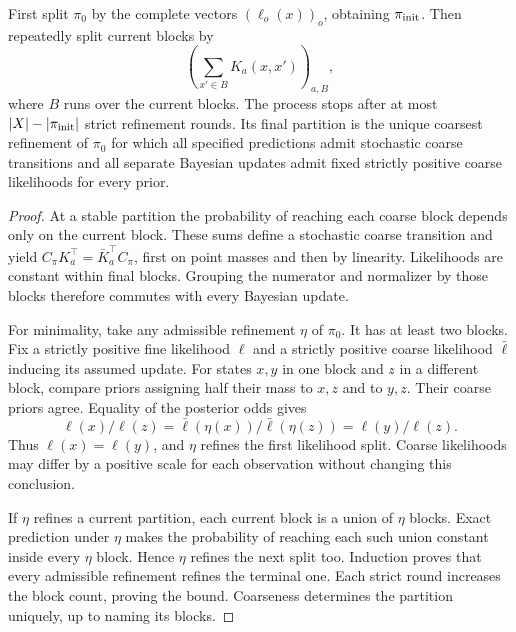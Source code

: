 \begin{theorem}\label{r:joint-refinement}
First split $\pi_0$ by the complete vectors $(\ell_o(x))_o$, obtaining $\pi_{\rm init}$. Then repeatedly split current blocks by
\[
 \left(\sum_{x'\in B}K_a(x,x')\right)_{a,B},
\]
where $B$ runs over the current blocks. The process stops after at most $|X|-|\pi_{\rm init}|$ strict refinement rounds. Its final partition is the unique coarsest refinement of $\pi_0$ for which all specified predictions admit stochastic coarse transitions and all separate Bayesian updates admit fixed strictly positive coarse likelihoods for every prior.
\end{theorem}
\begin{proof}
At a stable partition the probability of reaching each coarse block depends only on the current block. These sums define a stochastic coarse transition and yield $C_\pi K_a^\top=\bar K_a^\top C_\pi$, first on point masses and then by linearity. Likelihoods are constant within final blocks. Grouping the numerator and normalizer by those blocks therefore commutes with every Bayesian update.

For minimality, take any admissible refinement $\eta$ of $\pi_0$. It has at least two blocks. Fix a strictly positive fine likelihood $\ell$ and a strictly positive coarse likelihood $\bar\ell$ inducing its assumed update. For states $x,y$ in one block and $z$ in a different block, compare priors assigning half their mass to $x,z$ and to $y,z$. Their coarse priors agree. Equality of the posterior odds gives
\[
 \ell(x)/\ell(z)=\bar\ell(\eta(x))/\bar\ell(\eta(z))=\ell(y)/\ell(z).
\]
Thus $\ell(x)=\ell(y)$, and $\eta$ refines the first likelihood split. Coarse likelihoods may differ by a positive scale for each observation without changing this conclusion.

If $\eta$ refines a current partition, each current block is a union of $\eta$ blocks. Exact prediction under $\eta$ makes the probability of reaching each such union constant inside every $\eta$ block. Hence $\eta$ refines the next split too. Induction proves that every admissible refinement refines the terminal one. Each strict round increases the block count, proving the bound. Coarseness determines the partition uniquely, up to naming its blocks.
\end{proof}

